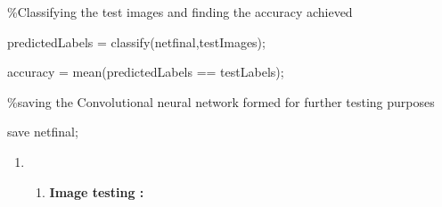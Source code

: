 \documentclass{article} %
\begin{document}
\noindent \%Classifying the test images and finding the accuracy achieved

\noindent predictedLabels = classify(netfinal,testImages);

\noindent accuracy = mean(predictedLabels == testLabels);

\noindent 

\noindent \%saving the Convolutional neural network formed for further testing purposes

\noindent save netfinal;

\noindent 

\noindent 

\noindent 

\noindent 

\noindent 

\noindent 

\noindent 

\noindent 

\noindent 

\noindent 

\noindent 

\noindent 

\noindent 

\noindent 

\noindent 

\noindent 

\noindent 

\noindent 

\noindent 

\noindent 

\noindent 

\noindent 

\noindent 

\noindent 

\noindent 

\noindent 

\noindent 

\noindent 

\noindent 

\noindent 

\noindent 

\noindent 

\begin{enumerate}
\item \begin{enumerate}
\item  \textbf{ Image testing :}
\end{enumerate}
\end{enumerate}
\end{document}
